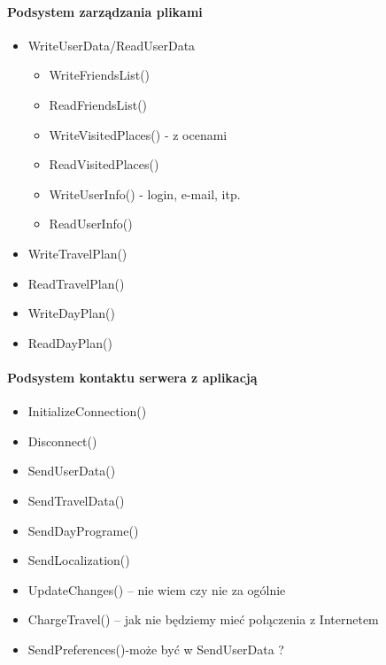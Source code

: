 \documentclass[10pt,twoside,a4paper]{report}
\begin{document}
\paragraph{Podsystem zarządzania plikami}
\begin{itemize}
\item WriteUserData/ReadUserData
\begin{itemize}
\item WriteFriendsList()
\item ReadFriendsList()
\item WriteVisitedPlaces() - z ocenami
\item ReadVisitedPlaces()
\item WriteUserInfo() - login, e-mail, itp.
\item ReadUserInfo()
\end{itemize}
\item WriteTravelPlan()
\item ReadTravelPlan()
\item WriteDayPlan()
\item ReadDayPlan()
\end{itemize}

\paragraph{Podsystem kontaktu serwera z aplikacją}
\begin{itemize}
\item InitializeConnection()
\item Disconnect()
\item SendUserData()
\item SendTravelData()
\item SendDayPrograme()
\item SendLocalization()
\item UpdateChanges() – nie wiem czy nie za ogólnie
\item ChargeTravel() – jak nie będziemy mieć połączenia z Internetem
\item SendPreferences()-może być w SendUserData ? 

\end{itemize}
\end{document}
